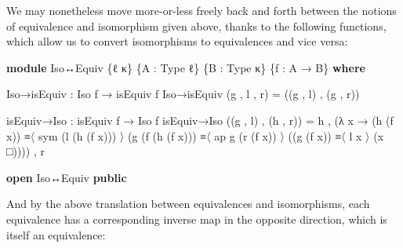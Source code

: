 \documentclass[
  11pt,
  oneside,
  article]{memoir}
\newenvironment{Shaded}{}{}
\newcommand{\KeywordTok}[1]{\textcolor[rgb]{0.00,0.44,0.13}{\textbf{#1}}}
\newcommand{\NormalTok}[1]{#1}
\newcommand{\OtherTok}[1]{\textcolor[rgb]{0.00,0.44,0.13}{#1}}
\theoremstyle{definition}
\theoremstyle{plain}
\newcommand{\0}{\textsf{0}}
\newcommand{\1}{\tn{\textsf{1}}}
\begin{document}
We may nonetheless move more-or-less freely back and forth between the
notions of equivalence and isomorphism given above, thanks to the
following functions, which allow us to convert isomorphisms to
equivalences and vice versa:

\begin{Shaded}
\begin{Highlighting}[]
\KeywordTok{module}\NormalTok{ Iso↔Equiv }\OtherTok{\{}\NormalTok{ℓ κ}\OtherTok{\}} \OtherTok{\{}\NormalTok{A }\OtherTok{:}\NormalTok{ Type ℓ}\OtherTok{\}} \OtherTok{\{}\NormalTok{B }\OtherTok{:}\NormalTok{ Type κ}\OtherTok{\}} \OtherTok{\{}\NormalTok{f }\OtherTok{:}\NormalTok{ A }\OtherTok{→}\NormalTok{ B}\OtherTok{\}} \KeywordTok{where}

\NormalTok{    Iso→isEquiv }\OtherTok{:}\NormalTok{ Iso f }\OtherTok{→}\NormalTok{ isEquiv f}
\NormalTok{    Iso→isEquiv }\OtherTok{(}\NormalTok{g , l , r}\OtherTok{)} \OtherTok{=} \OtherTok{((}\NormalTok{g , l}\OtherTok{)}\NormalTok{ , }\OtherTok{(}\NormalTok{g , r}\OtherTok{))}

\NormalTok{    isEquiv→Iso }\OtherTok{:}\NormalTok{ isEquiv f }\OtherTok{→}\NormalTok{ Iso f}
\NormalTok{    isEquiv→Iso }\OtherTok{((}\NormalTok{g , l}\OtherTok{)}\NormalTok{ , }\OtherTok{(}\NormalTok{h , r}\OtherTok{))} \OtherTok{=} 
\NormalTok{        h , }\OtherTok{(λ}\NormalTok{ x }\OtherTok{→} \OtherTok{(}\NormalTok{h }\OtherTok{(}\NormalTok{f x}\OtherTok{))}\NormalTok{        ≡〈 sym }\OtherTok{(}\NormalTok{l }\OtherTok{(}\NormalTok{h }\OtherTok{(}\NormalTok{f x}\OtherTok{)))}\NormalTok{ 〉 }
                   \OtherTok{(}\NormalTok{g }\OtherTok{(}\NormalTok{f }\OtherTok{(}\NormalTok{h }\OtherTok{(}\NormalTok{f x}\OtherTok{)))}\NormalTok{ ≡〈 ap g }\OtherTok{(}\NormalTok{r }\OtherTok{(}\NormalTok{f x}\OtherTok{))}\NormalTok{ 〉}
                   \OtherTok{((}\NormalTok{g }\OtherTok{(}\NormalTok{f x}\OtherTok{))}\NormalTok{       ≡〈 l x 〉 }
                   \OtherTok{(}\NormalTok{x □}\OtherTok{))))}\NormalTok{ , r}

\KeywordTok{open}\NormalTok{ Iso↔Equiv }\KeywordTok{public}
\end{Highlighting}
\end{Shaded}

And by the above translation between equivalences and isomorphisms, each
equivalence has a corresponding inverse map in the opposite direction,
which is itself an equivalence:
\end{document}

